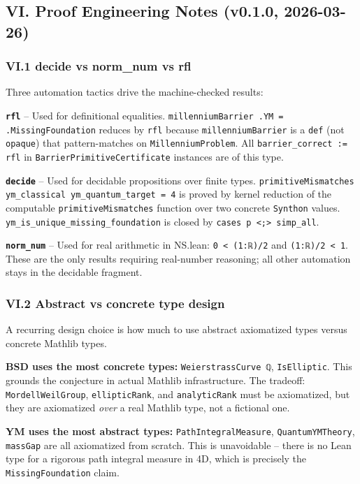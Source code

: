 \documentclass[12pt,a4paper]{article}
\begin{document}
\subsection{VI. Proof Engineering Notes (v0.1.0, 2026-03-26)}

\subsubsection{VI.1 decide vs norm\_num vs rfl}

Three automation tactics drive the machine-checked results:

\textbf{\texttt{rfl}}  --  Used for definitional equalities. \texttt{millenniumBarrier .YM = .MissingFoundation} reduces by \texttt{rfl} because \texttt{millenniumBarrier} is a \texttt{def} (not \texttt{opaque}) that pattern-matches on \texttt{MillenniumProblem}. All \texttt{barrier\_correct := rfl} in \texttt{BarrierPrimitiveCertificate} instances are of this type.

\textbf{\texttt{decide}}  --  Used for decidable propositions over finite types. \texttt{primitiveMismatches ym\_classical ym\_quantum\_target = 4} is proved by kernel reduction of the computable \texttt{primitiveMismatches} function over two concrete \texttt{Synthon} values. \texttt{ym\_is\_unique\_missing\_foundation} is closed by \texttt{cases p \textless{};\textgreater{} simp\_all}.

\textbf{\texttt{norm\_num}}  --  Used for real arithmetic in NS.lean: \texttt{0 \textless{} (1:ℝ)/2} and \texttt{(1:ℝ)/2 \textless{} 1}. These are the only results requiring real-number reasoning; all other automation stays in the decidable fragment.

\subsubsection{VI.2 Abstract vs concrete type design}

A recurring design choice is how much to use abstract axiomatized types versus concrete Mathlib types.

\textbf{BSD uses the most concrete types:} \texttt{WeierstrassCurve ℚ}, \texttt{IsElliptic}. This grounds the conjecture in actual Mathlib infrastructure. The tradeoff: \texttt{MordellWeilGroup}, \texttt{ellipticRank}, and \texttt{analyticRank} must be axiomatized, but they are axiomatized \emph{over} a real Mathlib type, not a fictional one.

\textbf{YM uses the most abstract types:} \texttt{PathIntegralMeasure}, \texttt{QuantumYMTheory}, \texttt{massGap} are all axiomatized from scratch. This is unavoidable  --  there is no Lean type for a rigorous path integral measure in 4D, which is precisely the \texttt{MissingFoundation} claim.
\end{document}
